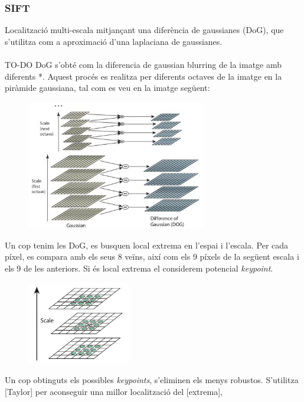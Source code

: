 	\subsubsection{SIFT}
	Localització multi-escala mitjançant una diferència de gaussianes (DoG), que s'utilitza com a aproximació d'una laplaciana de gaussianes.\\\\
	{TO-DO}
	DoG s'obté com la diferencia de gaussian blurring de la imatge amb diferents *. Aquest procés es realitza per diferents octaves de la imatge en la
	piràmide gaussiana, tal com es veu en la imatge següent:\\
	\begin{figure}[H]
		\centering
		\includegraphics[width=0.7\textwidth]{images/sift_dog}
	\end{figure}
	\noindent
	Un cop tenim les DoG, es busquen {local extrema} en l'espai i l'escala. Per cada píxel, es compara amb els seus 8 veïns, així com els 9 píxels de la
	següent escala i els 9 de les anteriors. Si és {local extrema} el considerem potencial \textit{keypoint}.\\
	\begin{figure}[H]
		\centering
		\includegraphics[width=0.4\textwidth]{images/sift_local_extrema}
	\end{figure}
	\noindent
	Un cop obtinguts els possibles \textit{keypoints}, s'eliminen els menys robustos. S'utilitza [Taylor] per aconseguir una millor localització del [extrema],
